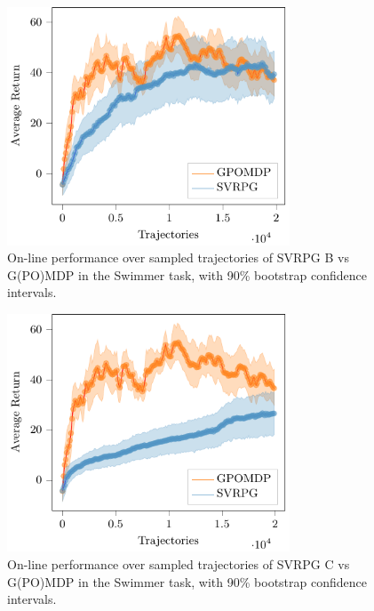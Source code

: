 \begin{figure}[h]
	\begin{minipage}[h]{1\textwidth}
		\centering
		\includegraphics[width=0.75\textwidth]{Images/Experiments/swimmer_SVRPG_vs_GPOMDP_B.pdf}
		\vspace{-0.1in}
		\caption{On-line performance over sampled trajectories of \acs{SVRPG} B vs G(PO)MDP in the Swimmer task, with 90\% bootstrap confidence intervals.}
		\label{fig:swimmerfive}
	\end{minipage}
	\vspace{-0.15in}
\end{figure}

\begin{figure}[h]
	\begin{minipage}[h]{1\textwidth}
		\centering
		\includegraphics[width=0.75\textwidth]{Images/Experiments/swimmer_SVRPG_vs_GPOMDP_C.pdf}
		\vspace{-0.1in}
		\caption{On-line performance over sampled trajectories of \acs{SVRPG} C vs G(PO)MDP in the Swimmer task, with 90\% bootstrap confidence intervals.}
		\label{fig:swimmerfour}
	\end{minipage}
	\vspace{-0.15in}
\end{figure}

